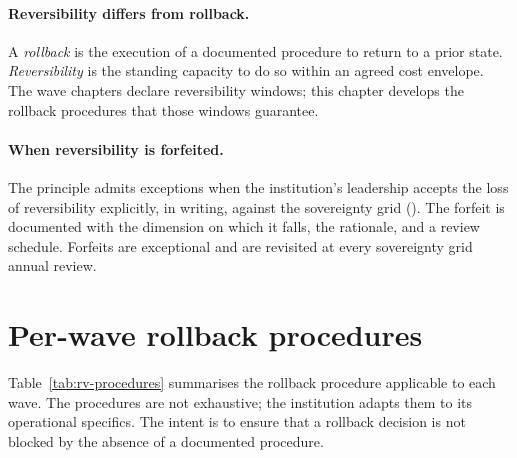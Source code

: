 \paragraph{Reversibility differs from rollback.} A \emph{rollback}
is the execution of a documented procedure to return to a prior
state. \emph{Reversibility} is the standing capacity to do so within
an agreed cost envelope. The wave chapters declare reversibility
windows; this chapter develops the rollback procedures that those
windows guarantee.

\paragraph{When reversibility is forfeited.} The principle admits
exceptions when the institution's leadership accepts the loss of
reversibility explicitly, in writing, against the sovereignty grid
(). The forfeit is documented with
the dimension on which it falls, the rationale, and a review
schedule. Forfeits are exceptional and are revisited at every
sovereignty grid annual review.

\section{Per-wave rollback procedures}
\label{sec:rv-procedures}

Table~\ref{tab:rv-procedures} summarises the rollback procedure
applicable to each wave. The procedures are not exhaustive; the
institution adapts them to its operational specifics. The intent is
to ensure that a rollback decision is not blocked by the absence of
a documented procedure.

